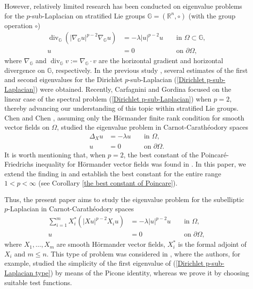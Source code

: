 \documentclass[a4paper,12pt,reqno]{amsart}
\renewcommand\eqref[1]{(\ref{#1})} %
\numberwithin{equation}{section}
\theoremstyle{plain}
\theoremstyle{definition}
\begin{document}
However, relatively limited research has been conducted on  eigenvalue problems for the $p$-sub-Laplacian on  stratified Lie groups $\mathbb{G}=\left(\mathbb{R}^{n}, \circ\right)$ (with the group operation $\circ$) 
\begin{equation}\label{Dirichlet p-sub-Laplacian}
\begin{aligned}
\operatorname{div}_{\mathbb{G}}\left(\left|\nabla_{\mathbb{G}} u\right|^{p-2} \nabla_{\mathbb{G}} u\right)&=-\lambda|u|^{p-2} u  &&\text { in } \Omega\subset \mathbb{G}, \\
u&=0 &&\text { on } \partial \Omega,
\end{aligned}
\end{equation}
where $\nabla_{\mathbb{G}}$ and  $\operatorname{div}_{\mathbb{G}} v:=\nabla_{\mathbb{G}} \cdot v$ are the horizontal gradient and  horizontal divergence on $\mathbb{G}$, respectively. In the previous study \cite{WNL2009}, several estimates of the first and second eigenvalues for the Dirichlet $p$-sub-Laplacian \eqref{Dirichlet p-sub-Laplacian} were obtained. Recently, Carfagnini and Gordina \cite{ CG2024} focused on the linear case of the spectral problem \eqref{Dirichlet p-sub-Laplacian} when $p=2$, thereby advancing our understanding of this topic within stratified Lie groups.  Chen and Chen \cite{Chen2021}, assuming only the H\"ormander finite rank condition for smooth vector fields on $\Omega$, studied the eigenvalue problem in Carnot-Carath\'eodory spaces
\begin{equation*}
\begin{aligned}
\Delta_{X} u&=-\lambda u  &&\text { in } \Omega, \\
u&=0 &&\text { on } \partial \Omega.
\end{aligned}
\end{equation*}
It is worth mentioning that, when $p=2$, the best constant of the Poincar\'e-Friedrichs inequality for H\"ormander vector fields was found in \cite{Chen2021}. In this paper, we extend the finding in \cite{Chen2021} and establish the best constant for the entire range $1<p<\infty$ (see Corollary \ref{the best constant of Poincare}). 

Thus, the present paper aims to study the eigenvalue problem for the subelliptic $p$-Laplacian in Carnot-Carath\'eodory spaces
\begin{equation}\label{Dirichlet p-sub-Laplacian type}
\begin{aligned}
\sum_{i=1}^{m}X_{i}^{*}\left(\left|X u\right|^{p-2} X_{i}u\right)&=-\lambda|u|^{p-2} u  &&\text { in } \Omega, \\
u&=0 &&\text { on } \partial \Omega,
\end{aligned}
\end{equation}
where $X_{1}, \ldots, X_{m}$  are smooth  H\"ormander vector fields, $X_{i}^{*}$ is the formal adjoint of $X_{i}$ and $m\leq n$. This type of problem was considered in \cite{RSS2021}, where the authors, for example, studied the simplicity of the first eigenvalue of \eqref{Dirichlet p-sub-Laplacian type} by means of the Picone identity, whereas we prove it by choosing suitable test functions.
\end{document}

